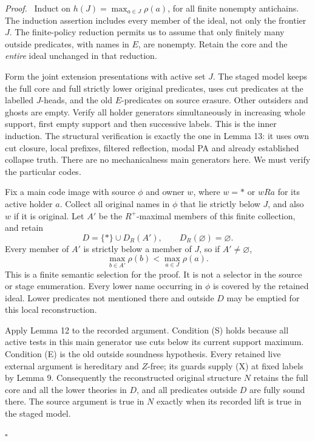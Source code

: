 \documentclass[11pt]{article}
\newcommand{\qed}{\hfill\ensuremath{\square}}
\newenvironment{proof}{\par\emph{Proof.}\ }{\qed\par}
\begin{document}
\begin{proof}
Induct on $h(J)=\max_{a\in J}\rho(a)$, for all finite nonempty
antichains. The induction assertion includes every member of the
ideal, not only the frontier $J$. The finite-policy reduction permits
us to assume that only finitely many outside predicates, with names
in $E$, are nonempty. Retain the core and the \emph{entire} ideal
unchanged in that reduction.

Form the joint extension presentations with active set $J$. The
staged model keeps the full core and full strictly lower original
predicates, uses cut predicates at the labelled $J$-heads, and the
old $E$-predicates on source erasure. Other outsiders and ghosts are
empty. Verify all holder generators simultaneously in increasing
whole support, first empty support and then successive labels.
This is the inner induction. The structural verification is exactly
the one in Lemma 13: it uses own cut closure, local prefixes,
filtered reflection, modal PA and already established collapse truth.
There are no mechanicalness main generators here. We must verify
the particular codes.

Fix a main code image with source $\phi$ and owner $w$, where $w=*$
or $wRa$ for its active holder $a$. Collect all original names in
$\phi$ that lie strictly below $J$, and also $w$ if it is original.
Let $A'$ be the $R^+$-maximal members of this finite collection, and
retain
\[
 D=\{*\}\cup D_R(A'),
 \qquad D_R(\varnothing)=\varnothing.
\]
Every member of $A'$ is strictly below a member of $J$, so if
$A'\ne\varnothing$,
\begin{equation}\label{eq:rank-decrease}
 \max_{b\in A'}\rho(b)<\max_{a\in J}\rho(a).
\end{equation}
This is a finite semantic selection for the proof. It is not a
selector in the source or stage enumeration. Every lower name
occurring in $\phi$ is covered by the retained ideal. Lower
predicates not mentioned there and outside $D$ may be emptied for
this local reconstruction.

Apply Lemma 12 to the recorded argument. Condition (S) holds because
all active tests in this main generator use cuts below its current
support maximum. Condition (E) is the old outside soundness
hypothesis. Every retained live external argument is hereditary
and $Z$-free; its guards supply (X) at fixed labels by Lemma 9.
Consequently the reconstructed original structure $N$ retains the
full core and all the lower theories in $D$, and all predicates
outside $D$ are fully sound there. The source argument is true in
$N$ exactly when its recorded lift is true in the staged model.


\end{proof}
\end{document}
